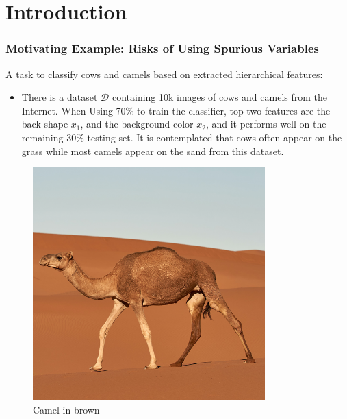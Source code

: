 \section{Introduction}
\begin{frame}
  \frametitle{Motivating Example: Risks of Using Spurious Variables}
   A task to classify cows and camels based on extracted hierarchical features: 
  \begin{itemize}
  \item There is a dataset $\mathcal D$ containing 10k images of cows and camels from the Internet. When Using 70\% to train the classifier, top two features are the back shape $x_1$, and the background color $x_2$, and it performs well on the remaining 30\% testing set. It is contemplated that cows often appear on the grass while most camels appear on the sand from this dataset.
  \end{itemize}
  \vspace{6pt}
  \centering
  \begin{minipage}{.3\textwidth}
    \begin{figure}[H]
      \centering \includegraphics[width=0.8\textwidth]{figs/camel_sand.png}
      \caption{Camel in brown}
    \end{figure}
  \end{minipage}%
  \begin{minipage}{.3\textwidth}
    \begin{figure}[H]

\end{figure}
\end{minipage}
\end{frame}
